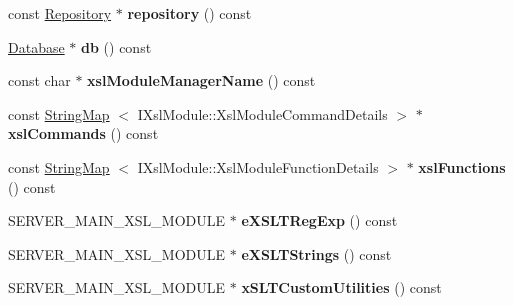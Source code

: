 \begin{DoxyCompactItemize}
\item 
\hypertarget{classgeneral__server_1_1Database_a48e2c66bca2768e23af5d41b7ad62d8f}{const \hyperlink{classgeneral__server_1_1Repository}{\-Repository} $\ast$ {\bfseries repository} () const }\label{classgeneral__server_1_1Database_a48e2c66bca2768e23af5d41b7ad62d8f}

\item 
\hypertarget{classgeneral__server_1_1Database_a02e5c1cb2632b70136d6ce5b326fd533}{\hyperlink{classgeneral__server_1_1Database}{\-Database} $\ast$ {\bfseries db} () const }\label{classgeneral__server_1_1Database_a02e5c1cb2632b70136d6ce5b326fd533}

\item 
\hypertarget{classgeneral__server_1_1Database_a071690914aed178cc8b7468bcf395f18}{const char $\ast$ {\bfseries xsl\-Module\-Manager\-Name} () const }\label{classgeneral__server_1_1Database_a071690914aed178cc8b7468bcf395f18}

\item 
\hypertarget{classgeneral__server_1_1Database_acf48ab35477ab3447c425131a887ebcd}{const \hyperlink{classgeneral__server_1_1StringMap}{\-String\-Map}\*
$<$ \-I\-Xsl\-Module\-::\-Xsl\-Module\-Command\-Details $>$ $\ast$ {\bfseries xsl\-Commands} () const }\label{classgeneral__server_1_1Database_acf48ab35477ab3447c425131a887ebcd}

\item 
\hypertarget{classgeneral__server_1_1Database_a4c9d374d7b26a2f4868c29eec1c3489f}{const \hyperlink{classgeneral__server_1_1StringMap}{\-String\-Map}\*
$<$ \-I\-Xsl\-Module\-::\-Xsl\-Module\-Function\-Details $>$ $\ast$ {\bfseries xsl\-Functions} () const }\label{classgeneral__server_1_1Database_a4c9d374d7b26a2f4868c29eec1c3489f}

\item 
\hypertarget{classgeneral__server_1_1Database_a50de9578bd526276d62ae0d3688c85f0}{\-S\-E\-R\-V\-E\-R\-\_\-\-M\-A\-I\-N\-\_\-\-X\-S\-L\-\_\-\-M\-O\-D\-U\-L\-E $\ast$ {\bfseries e\-X\-S\-L\-T\-Reg\-Exp} () const }\label{classgeneral__server_1_1Database_a50de9578bd526276d62ae0d3688c85f0}

\item 
\hypertarget{classgeneral__server_1_1Database_a905243d0e29cacd33e63abaf7989754d}{\-S\-E\-R\-V\-E\-R\-\_\-\-M\-A\-I\-N\-\_\-\-X\-S\-L\-\_\-\-M\-O\-D\-U\-L\-E $\ast$ {\bfseries e\-X\-S\-L\-T\-Strings} () const }\label{classgeneral__server_1_1Database_a905243d0e29cacd33e63abaf7989754d}

\item 
\hypertarget{classgeneral__server_1_1Database_adc42fe4d43570f2c663f7dde58a24003}{\-S\-E\-R\-V\-E\-R\-\_\-\-M\-A\-I\-N\-\_\-\-X\-S\-L\-\_\-\-M\-O\-D\-U\-L\-E $\ast$ {\bfseries x\-S\-L\-T\-Custom\-Utilities} () const }\label{classgeneral__server_1_1Database_adc42fe4d43570f2c663f7dde58a24003}


\end{DoxyCompactItemize}
